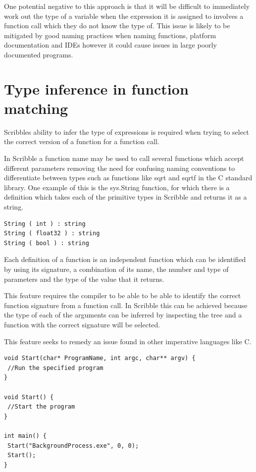 \documentclass[]{final_report}
\begin{document}
One potential negative to this approach is that it will be difficult to immediately work out the type of a variable when the expression it is assigned to involves a function call which they do not know the type of. This issue is likely to be mitigated by good naming practices when naming functions, platform documentation and IDEs however it could cause issues in large poorly documented programs.

\section{Type inference in function matching}

Scribbles ability to infer the type of expressions is required when trying to select the correct version of a function for a function call. 

In Scribble a function name may be used to call several functions which accept different parameters removing the need for confusing naming conventions to differentiate between types such as functions like sqrt and sqrtf in the C standard library. One example of this is the sys.String function, for which there is a definition which takes each of the primitive types in Scribble and returns it as a string.

\begin{verbatim}
String ( int ) : string
String ( float32 ) : string
String ( bool ) : string
\end{verbatim}

Each definition of a function is an independent function which can be identified by using its signature, a combination of its name, the number and type of parameters and the type of the value that it returns.

This feature requires the compiler to be able to be able to identify the correct function signature from a function call. In Scribble this can be achieved because the type of each of the arguments can be inferred by inspecting the tree and a function with the correct signature will be selected.

This feature seeks to remedy an issue found in other imperative languages like C.

\begin{verbatim}
void Start(char* ProgramName, int argc, char** argv) {
 //Run the specified program
}

void Start() {
 //Start the program
}

int main() {
 Start("BackgroundProcess.exe", 0, 0);
 Start();
}
\end{verbatim}
\end{document}
